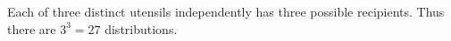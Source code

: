 Each of three distinct utensils independently has three possible recipients. Thus there are $\boxed{3^3=27}$ distributions.

